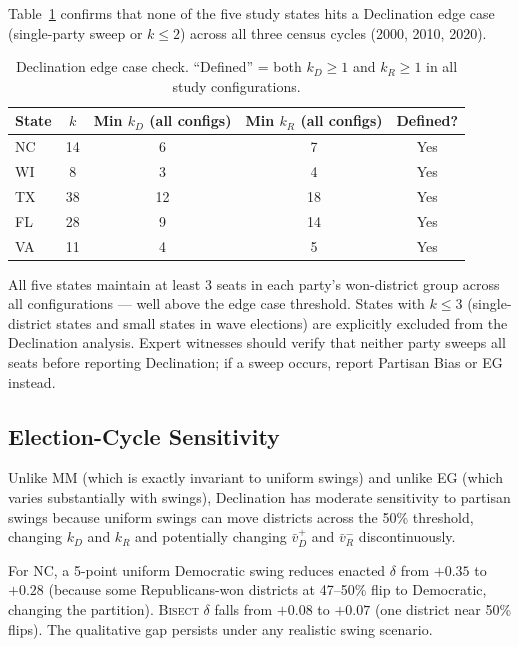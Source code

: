 Table~\ref{tab:decl-edgecases} confirms that none of the five study states hits
a Declination edge case (single-party sweep or $k \leq 2$) across all three census
cycles (2000, 2010, 2020).

\begin{table}[h]
\centering\small
\caption{Declination edge case check. ``Defined'' = both $k_D \geq 1$ and $k_R \geq 1$
in all study configurations.}
\label{tab:decl-edgecases}
\begin{tabular}{lcccc}
\toprule
State & $k$ & Min $k_D$ (all configs) & Min $k_R$ (all configs) & Defined? \\
\midrule
NC  & 14 & 6 & 7 & Yes \\
WI  &  8 & 3 & 4 & Yes \\
TX  & 38 & 12 & 18 & Yes \\
FL  & 28 & 9 & 14 & Yes \\
VA  & 11 & 4 & 5 & Yes \\
\bottomrule
\end{tabular}
\end{table}

All five states maintain at least 3 seats in each party's won-district group
across all configurations — well above the edge case threshold. States with
$k \leq 3$ (single-district states and small states in wave elections) are
explicitly excluded from the Declination analysis. Expert witnesses should verify
that neither party sweeps all seats before reporting Declination; if a sweep
occurs, report Partisan Bias or EG instead.

\subsection{Election-Cycle Sensitivity}

Unlike MM (which is exactly invariant to uniform swings) and unlike EG (which varies
substantially with swings), Declination has moderate sensitivity to partisan swings
because uniform swings can move districts across the 50\% threshold, changing
$k_D$ and $k_R$ and potentially changing $\bar{v}_D^+$ and $\bar{v}_R^-$ discontinuously.

For NC, a 5-point uniform Democratic swing reduces enacted $\delta$ from $+0.35$
to $+0.28$ (because some Republicans-won districts at 47--50\% flip to Democratic,
changing the partition). \textsc{Bisect} $\delta$ falls from $+0.08$ to $+0.07$
(one district near 50\% flips). The qualitative gap persists under any realistic
swing scenario.
